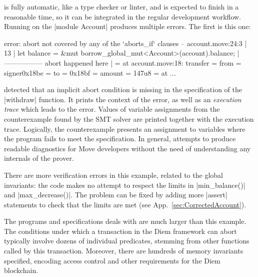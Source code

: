 
\label{sec:RunningProver}

\MVP is fully automatic, like a type checker or linter, and is
expected to finish in a reasonable time, so it can be integrated in
the regular development workflow. Running \MVP on the |module Account| produces
multiple errors. The first is this one:

\begin{MoveDiag}
error: abort not covered by any of the `aborts_if` clauses
   -- account.move:24:3
   |
13 |       let balance = &mut borrow_global_mut<Account>(account).balance;
   |                          ----------------- abort happened here
   |
   =     at account.move:18: transfer
   =         from = signer{0x18be}
   =         to = 0x18bf
   =         amount = 147u8
   =     at ...
\end{MoveDiag}

\noindent \MVP detected that an implicit abort condition is missing in the
specification of the |withdraw| function. It prints the context of the error, as
well as an \emph{execution trace} which leads to the error. Values of variable
assignments from the counterexample found by the SMT solver are printed together
with the execution trace. Logically, the counterexample presents an
assignment to variables where the program fails to meet the specification. In
general, \MVP attempts to produce readable diagnostics for Move developers
without the need of understanding any internals of the prover.

There are more verification errors in this example, related to the global
invariants: the code makes no attempt to respect the limits in |min_balance()|
and |max_decrease()|.  The problem can be fixed by adding more |assert|
statements to check that the limits are met
(see App.~\ref{sec:CorrectedAccount}).


The programs and specifications \MVP deals with are much larger than
this example. The conditions under which a transaction
in the Diem framework can abort typically involve dozens of individual predicates,
stemming from other functions called by this transaction. Moreover, there are
hundreds of memory invariants specified, encoding access control and other
requirements for the Diem blockchain.

